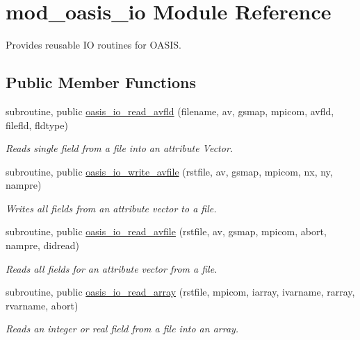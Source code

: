 \hypertarget{classmod__oasis__io}{\section{mod\+\_\+oasis\+\_\+io Module Reference}
\label{classmod__oasis__io}
}


Provides reusable I\+O routines for O\+A\+S\+I\+S.  


\subsection*{Public Member Functions}
\begin{DoxyCompactItemize}
\item 
subroutine, public \hyperlink{classmod__oasis__io_a6c14bebb7b216218e25f599e3469ae0c}{oasis\+\_\+io\+\_\+read\+\_\+avfld} (filename, av, gsmap, mpicom, avfld, filefld, fldtype)
\begin{DoxyCompactList}\small\item\em Reads single field from a file into an attribute Vector. \end{DoxyCompactList}\item 
subroutine, public \hyperlink{classmod__oasis__io_ad8a48d6c36e3fac637a8191c20e514f2}{oasis\+\_\+io\+\_\+write\+\_\+avfile} (rstfile, av, gsmap, mpicom, nx, ny, nampre)
\begin{DoxyCompactList}\small\item\em Writes all fields from an attribute vector to a file. \end{DoxyCompactList}\item 
subroutine, public \hyperlink{classmod__oasis__io_a65e17e4a065e8e4dea33754fb9c1d32c}{oasis\+\_\+io\+\_\+read\+\_\+avfile} (rstfile, av, gsmap, mpicom, abort, nampre, didread)
\begin{DoxyCompactList}\small\item\em Reads all fields for an attribute vector from a file. \end{DoxyCompactList}\item 
subroutine, public \hyperlink{classmod__oasis__io_a8b604f89345d74c74c6bc3b4760b2e29}{oasis\+\_\+io\+\_\+read\+\_\+array} (rstfile, mpicom, iarray, ivarname, rarray, rvarname, abort)
\begin{DoxyCompactList}\small\item\em Reads an integer or real field from a file into an array. \end{DoxyCompactList}\item 

\end{DoxyCompactItemize}

